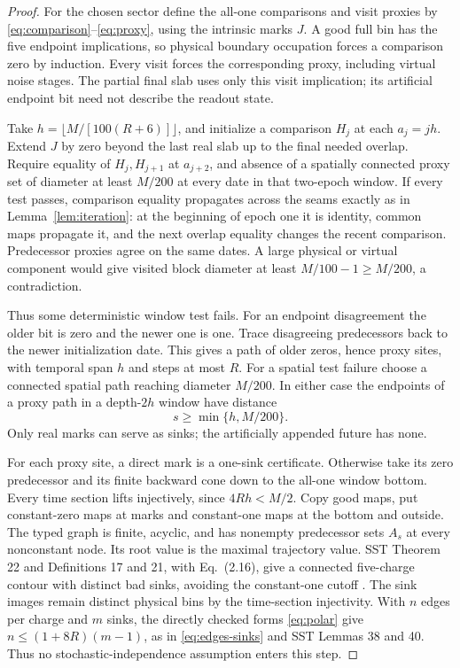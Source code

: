 \begin{proof}
For the chosen sector define the all-one comparisons and visit
proxies by \eqref{eq:comparison}--\eqref{eq:proxy}, using the
intrinsic marks \(J\).
A good full bin has the five endpoint implications, so physical
boundary occupation forces a comparison zero by induction.
Every visit forces the corresponding proxy, including virtual
noise stages. The partial final slab uses only this visit
implication; its artificial endpoint bit need not describe
the readout state.

Take \(h=\lfloor M/[100(R+6)]\rfloor\), and initialize a comparison
\(H_j\) at each \(a_j=jh\). Extend \(J\) by zero beyond the last
real slab up to the final needed overlap.
Require equality of \(H_j,H_{j+1}\) at \(a_{j+2}\), and absence
of a spatially connected proxy set of diameter at least \(M/200\)
at every date in that two-epoch window.
If every test passes, comparison equality propagates across the
seams exactly as in Lemma~\ref{lem:iteration}: at the beginning
of epoch one it is identity, common maps propagate it, and the
next overlap equality changes the recent comparison.
Predecessor proxies agree on the same dates.
A large physical or virtual component would give visited block
diameter at least \(M/100-1\ge M/200\), a contradiction.

Thus some deterministic window test fails.
For an endpoint disagreement the older bit is zero and the newer
one is one. Trace disagreeing predecessors back to the newer
initialization date. This gives a path of older zeros, hence
proxy sites, with temporal span \(h\) and steps at most \(R\).
For a spatial test failure choose a connected spatial path
reaching diameter \(M/200\).
In either case the endpoints of a proxy path in a depth-\(2h\)
window have distance
\[
 s\ge\min\{h,M/200\}.
\]
Only real marks can serve as sinks; the artificially appended
future has none.

For each proxy site, a direct mark is a one-sink certificate.
Otherwise take its zero predecessor and its finite backward
cone down to the all-one window bottom.
Every time section lifts injectively, since \(4Rh<M/2\).
Copy good maps, put constant-zero maps at marks and constant-one
maps at the bottom and outside.
The typed graph is finite, acyclic, and has nonempty predecessor
sets \(A_s\) at every nonconstant node. Its root value is the
maximal trajectory value.
SST Theorem 22 and Definitions 17 and 21, with Eq.~(2.16),
give a connected five-charge contour with distinct bad sinks,
avoiding the constant-one cutoff \cite{SST}.
The sink images remain distinct physical bins by the
time-section injectivity.
With \(n\) edges per charge and \(m\) sinks, the directly
checked forms \eqref{eq:polar} give
\(n\le(1+8R)(m-1)\), as in \eqref{eq:edges-sinks}
and SST Lemmas 38 and 40.
Thus no stochastic-independence assumption enters this step.


\end{proof}
